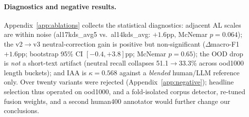 \paragraph{Diagnostics and negative results.}
Appendix~\ref{app:ablations} collects the statistical diagnostics:
adjacent AL scales are within noise (al17kds\_avg5 vs.\
al14kds\_avg: $+1.6$pp, McNemar $p{=}0.064$); the v2$\to$v3
neutral-correction gain is positive but non-significant
($\Delta$macro-F1 $+1.6$pp; bootstrap 95\% CI $[-0.4,+3.8]$pp;
McNemar $p{=}0.65$); the OOD drop is \emph{not} a short-text artifact
(neutral recall collapses 51.1$\to$33.3\% across ood1000 length
buckets); and IAA is $\kappa{=}0.568$ against a \emph{blended}
human/LLM reference only. Over twenty variants were rejected
(Appendix~\ref{app:negative}); headline selection thus operated on
ood1000, and a fold-isolated corpus detector, re-tuned fusion weights,
and a second human400 annotator would further change our conclusions.

